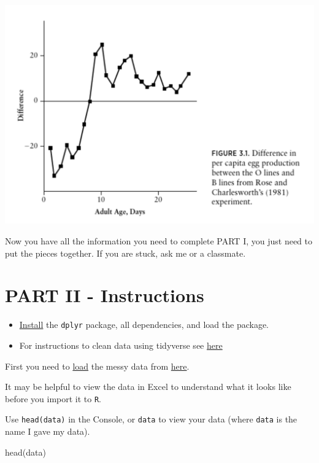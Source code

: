 \documentclass[
]{book}
\newenvironment{Shaded}{\begin{snugshade}}{\end{snugshade}}
\newcommand{\FunctionTok}[1]{\textcolor[rgb]{0.00,0.00,0.00}{#1}}
\newcommand{\NormalTok}[1]{#1}
\begin{document}
\includegraphics[width=0.9\linewidth]{figures/actual-fig}

Now you have all the information you need to complete PART I, you just need to put the pieces together. If you are stuck, ask me or a classmate.

\hypertarget{partII}{%
\chapter*{PART II - Instructions}\label{partII}}

\begin{itemize}
\item
  \href{https://ahurford.github.io/quant-guide-all-courses/install.html}{Install} the \texttt{dplyr} package, all dependencies, and load the package.
\item
  For instructions to clean data using tidyverse see \href{https://ahurford.github.io/quant-guide-all-courses/handling-data.html\#dplyr}{here}
\end{itemize}

First you need to \href{https://ahurford.github.io/quant-guide-all-courses/data-entry.html\#loading-or-importing-data}{load} the messy data from \href{https://datacarpentry.org/semester-biology/exercises/Tidy-data-improving-messy-data-SQL/}{here}.

It may be helpful to view the data in Excel to understand what it looks like before you import it to \texttt{R}.

Use \texttt{head(data)} in the Console, or \texttt{data} to view your data (where \texttt{data} is the name I gave my data).

\begin{Shaded}
\begin{Highlighting}[]
\FunctionTok{head}\NormalTok{(data)}
\end{Highlighting}
\end{Shaded}
\end{document}
